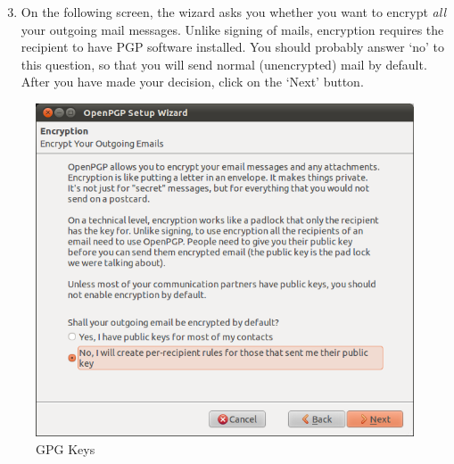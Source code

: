 \begin{enumerate}[1.]
\setcounter{enumi}{2}
\item
  On the following screen, the wizard asks you whether you want to
  encrypt \emph{all} your outgoing mail messages. Unlike signing of
  mails, encryption requires the recipient to have PGP software
  installed. You should probably answer `no' to this question, so that
  you will send normal (unencrypted) mail by default. After you have
  made your decision, click on the `Next' button.
\end{enumerate}
\begin{figure}[htbp]
\centering
\includegraphics{gpg_keys_3.png}
\caption{GPG Keys}
\end{figure}

